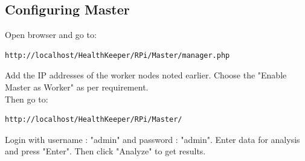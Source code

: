 \documentclass{article}
\begin{document}
\subsection{Configuring Master}
Open browser and go to:
\begin{lstlisting}[style=BashInputStyle]
    http://localhost/HealthKeeper/RPi/Master/manager.php
\end{lstlisting}
Add the IP addresses of the worker nodes noted earlier. Choose the "Enable Master as Worker" as per requirement.
\\Then go to:
\begin{lstlisting}[style=BashInputStyle]
    http://localhost/HealthKeeper/RPi/Master/
\end{lstlisting}
Login with username : "admin" and password : "admin". Enter data for analysis and press "Enter". Then click "Analyze" to get results.
\end{document}
